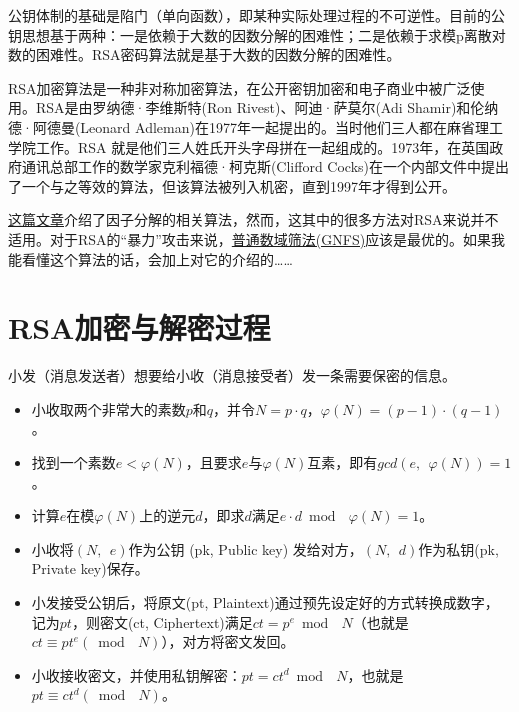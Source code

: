 \documentclass[a4paper]{article}         %
\newcommand{\upcite}[1]{\textsuperscript{\cite{#1}}} %
\begin{document}
公钥体制的基础是陷门（单向函数），即某种实际处理过程的不可逆性。目前的公钥思想基于两种：一是依赖于大数的因数分解的困难性；二是依赖于求模p离散对数的困难性。RSA密码算法就是基于大数的因数分解的困难性\upcite{chenchuanbo2006rsa}。

RSA加密算法是一种非对称加密算法，在公开密钥加密和电子商业中被广泛使用。RSA是由罗纳德·李维斯特(Ron Rivest)、阿迪·萨莫尔(Adi Shamir)和伦纳德·阿德曼(Leonard Adleman)在1977年一起提出的。当时他们三人都在麻省理工学院工作。RSA 就是他们三人姓氏开头字母拼在一起组成的。1973年，在英国政府通讯总部工作的数学家克利福德·柯克斯(Clifford Cocks)在一个内部文件中提出了一个与之等效的算法，但该算法被列入机密，直到1997年才得到公开。

\href{https://mathmu.github.io/MTCAS/doc/IntegerFactorization.html}{这篇文章}介绍了因子分解的相关算法，然而，这其中的很多方法对RSA来说并不适用。对于RSA的“暴力”攻击来说，\href{https://zh.wikipedia.org/wiki/%E6%99%AE%E9%80%9A%E6%95%B0%E5%9F%9F%E7%AD%9B%E9%80%89%E6%B3%95}{普通数域筛法(GNFS)}应该是最优的。如果我能看懂这个算法的话，会加上对它的介绍的…… %

\section{RSA加密与解密过程} \label{RSA加密与解密过程}

小发（消息发送者）想要给小收（消息接受者）发一条需要保密的信息。

\begin{itemize}
	\item 小收取两个非常大的素数$p$和$q$，并令$N = p \cdot q$，$\varphi(N) = (p - 1) \cdot (q - 1)$。
	\item 找到一个素数$e < \varphi(N)$，且要求$e$与$\varphi(N)$互素，即有$gcd(e, \phantom{;} \varphi(N)) = 1$。 %
	\item 计算$e$在模$\varphi(N)$上的逆元$d$，即求$d$满足$e \cdot d \bmod \phantom{;} \varphi(N) = 1$。
	\item 小收将$(N, \phantom{;} e)$作为公钥 (pk, Public key) 发给对方，$(N, \phantom{;} d)$作为私钥(pk, Private key)保存。
	\item 小发接受公钥后，将原文(pt, Plaintext)通过预先设定好的方式转换成数字，记为$pt$，则密文(ct, Ciphertext)满足$ct = p ^ e \bmod \phantom{;} N$（也就是$ct \equiv pt ^ e (\bmod \phantom{;} N)$），对方将密文发回。
	\item 小收接收密文，并使用私钥解密：$pt = ct ^ d \bmod \phantom{;} N$，也就是$pt \equiv ct ^ d (\bmod \phantom{;} N)$。
\end{itemize}
\end{document}
